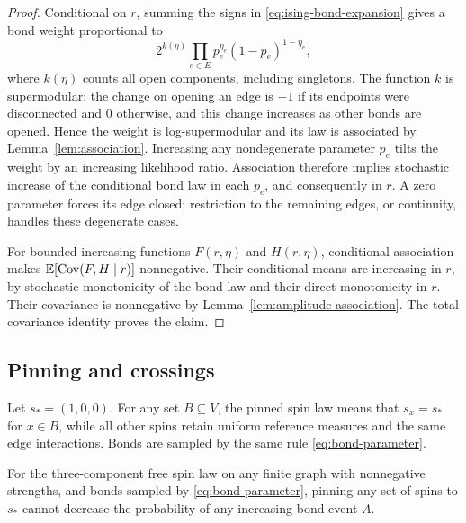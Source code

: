 \begin{proof}
Conditional on $r$, summing the signs in
\eqref{eq:ising-bond-expansion} gives a bond weight proportional to
\begin{equation}\label{eq:conditional-fk-weight}
 2^{k(\eta)}\prod_{e\in E}p_e^{\eta_e}(1-p_e)^{1-\eta_e},
\end{equation}
where $k(\eta)$ counts all open components, including singletons.
The function $k$ is supermodular: the change on opening an edge is
$-1$ if its endpoints were disconnected and $0$ otherwise, and this
change increases as other bonds are opened.  Hence the weight is
log-supermodular and its law is associated by
Lemma~\ref{lem:association}.  Increasing any nondegenerate parameter
$p_e$ tilts the weight by an increasing likelihood ratio.  Association
therefore implies stochastic increase of the conditional bond law
in each $p_e$, and consequently in $r$.  A zero parameter forces its
edge closed; restriction to the remaining edges, or continuity, handles
these degenerate cases.

For bounded increasing functions $F(r,\eta)$ and $H(r,\eta)$,
conditional association makes
$\mathbb E[\operatorname{Cov}(F,H\mid r)]$ nonnegative.  Their conditional
means are increasing in $r$, by stochastic monotonicity of the bond
law and their direct monotonicity in $r$.  Their covariance is
nonnegative by Lemma~\ref{lem:amplitude-association}.  The total
covariance identity proves the claim.
\end{proof}

\subsection{Pinning and crossings}

Let $s_*=(1,0,0)$.  For any set $B\subseteq V$, the pinned spin law
means that $s_x=s_*$ for $x\in B$, while all other spins retain uniform
reference measures and the same edge interactions.  Bonds are sampled
by the same rule \eqref{eq:bond-parameter}.

\begin{proposition}\label{prop:pinning}
For the three-component free spin law on any finite graph with
nonnegative strengths, and bonds sampled by \eqref{eq:bond-parameter},
pinning any set of spins to $s_*$ cannot decrease the probability of
any increasing bond event $A$.
\end{proposition}

